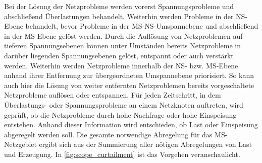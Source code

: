 Bei der Lösung der Netzprobleme werden vorerst Spannungsprobleme und abschließend Überlastungen behandelt.
Weiterhin werden Probleme in der \gls{NS}-Ebene behandelt, bevor Probleme in der \gls{MS}-\gls{NS}-Umspannebene und abschließend in der \gls{MS}-Ebene gelöst werden.
Durch die Auflösung von Netzproblemen auf tieferen Spannungsebenen können unter Umständen bereits Netzprobleme in darüber liegenden Spannungsebenen gelöst, entspannt oder auch verstärkt werden.
Weiterhin werden Netzprobleme innerhalb der \gls{NS}- bzw. \gls{MS}-Ebene anhand ihrer Entfernung zur übergeordneten Umspannebene priorisiert.
So kann auch hier die Lösung von weiter entfernten Netzproblemen bereits vorgeschaltete Netzprobleme auflösen oder entspannen.
Für jeden Zeitschritt, in dem Überlastungs- oder Spannungsprobleme an einem Netzknoten auftreten, wird geprüft, ob die Netzprobleme durch hohe Nachfrage oder hohe Einspeisung entstehen.
Anhand dieser Information wird entschieden, ob Last oder Einspeisung abgeregelt werden soll.
Die gesamte notwendige Abregelung für das \gls{MS}-Netzgebiet ergibt sich aus der Summierung aller nötigen Abregelungen von Last und Erzeugung.
In \autoref{fig:scope_curtailment} ist das Vorgehen veranschaulicht.




\clearpage
